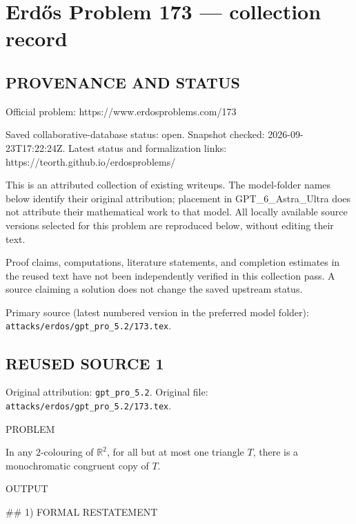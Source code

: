 \section*{Erd\H{o}s Problem 173 --- collection record}

\subsection*{PROVENANCE AND STATUS}
Official problem: https://www.erdosproblems.com/173

Saved collaborative-database status: open.
Snapshot checked: 2026-09-23T17:22:24Z.
Latest status and formalization links: https://teorth.github.io/erdosproblems/

This is an attributed collection of existing writeups. The model-folder names below identify their original attribution; placement in GPT\_6\_Astra\_Ultra does not attribute their mathematical work to that model. All locally available source versions selected for this problem are reproduced below, without editing their text.

Proof claims, computations, literature statements, and completion estimates in the reused text have not been independently verified in this collection pass. A source claiming a solution does not change the saved upstream status.

Primary source (latest numbered version in the preferred model folder): \texttt{attacks/erdos/gpt\_pro\_5.2/173.tex}.

\subsection*{REUSED SOURCE 1}
Original attribution: \texttt{gpt\_pro\_5.2}.
Original file: \texttt{attacks/erdos/gpt\_pro\_5.2/173.tex}.


PROBLEM

In any $2$-colouring of $\mathbb{R}^2$, for all but at most one triangle $T$, there is a monochromatic congruent copy of $T$.

OUTPUT

## 1) FORMAL RESTATEMENT

